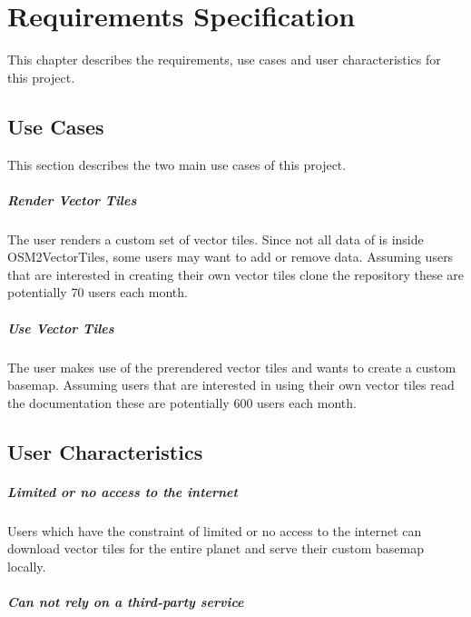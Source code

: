 \chapter{Requirements Specification}\label{requirements_specification}

This chapter describes the requirements, use cases and user characteristics for this project.

\section{Use Cases}\label{use_cases}

This section describes the two main use cases of this project.

\paragraph{Render Vector Tiles}\label{use_case_render_vector_tiles}

The user renders a custom set of vector tiles. Since not all data of \osm{} is inside OSM2VectorTiles, some users may want to add or remove data. Assuming users that are interested in creating their own vector tiles clone the \osmvt{} repository these are potentially 70 users each month.

\paragraph{Use Vector Tiles}\label{use_case_use_vector_tiles}

The user makes use of the prerendered vector tiles and wants to create a custom basemap. Assuming users that are interested in using their own vector tiles read the documentation these are potentially 600 users each month.

\section{User Characteristics}\label{user_characteristics}

\paragraph{Limited or no access to the internet}

Users which have the constraint of limited or no access to the internet can download vector tiles for the entire planet and serve their custom basemap locally.

\paragraph{Can not rely on a third-party service}

